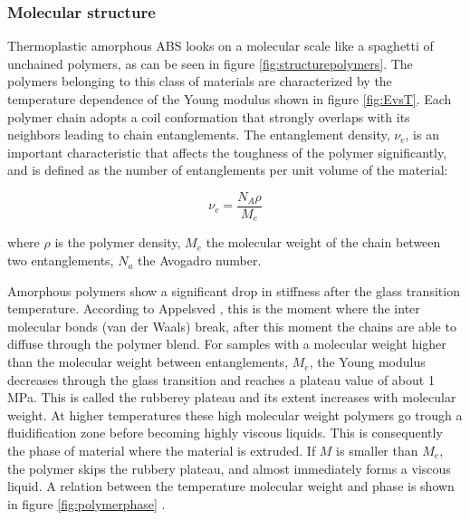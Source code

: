 \subsubsection{Molecular structure}
    Thermoplastic amorphous ABS looks on a molecular scale like a spaghetti of unchained polymers, as can be seen in figure  \ref{fig:structurepolymers}. The polymers belonging to this class of materials are characterized by the temperature dependence of the Young modulus shown in figure \ref{fig:EvsT}. Each polymer chain adopts a coil conformation that strongly overlaps with its neighbors leading to chain entanglements. The entanglement density, $\nu_e$, is an important characteristic that affects the toughness of the polymer significantly, and is defined as the number of entanglements per unit volume of the material:

\begin{equation} \label{eqn:Me}
\nu_e=\frac{N_A\rho}{M_e}
\end{equation}

where $\rho$ is the polymer density, $M_e$ the molecular weight of the chain between two entanglements, $N_a$ the Avogadro number\cite{Halary2011PolymerMaterials}. 

Amorphous polymers show a significant drop in stiffness after the glass transition temperature. According to Appelsved \cite{Appelsved2012InvestigationModels}, this is the moment where the inter molecular bonds (van der Waals) break, after this moment the chains are able to diffuse through the polymer blend. 
For samples with a molecular weight higher than the molecular weight between entanglements, $M_e$, the Young modulus decreases through the glass transition and reaches a plateau value of about 1 MPa. This is called the rubberey plateau and its extent increases with molecular weight. At higher temperatures these high molecular weight polymers go trough a fluidification zone before becoming highly viscous liquids. This is consequently the phase of material where the material is extruded. If  $M$ is smaller than $M_e$, the polymer skips the rubbery plateau, and almost immediately forms a viscous liquid. A relation between the temperature molecular weight and phase is shown in figure \ref{fig:polymerphase} \cite{Halary2011PolymerMaterials}.

